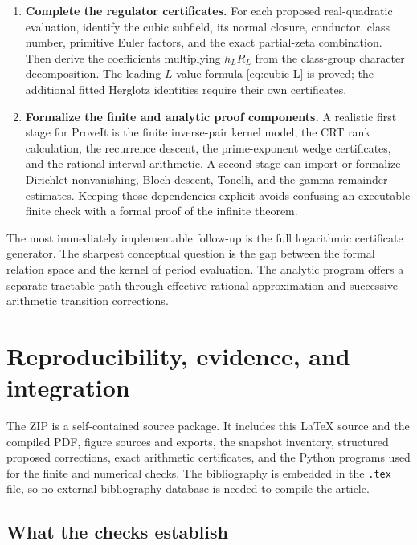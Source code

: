 \documentclass[11pt]{article}
\numberwithin{equation}{section}
\theoremstyle{definition}
\theoremstyle{remark}
\begin{document}
\begin{enumerate}[resume]
\item \textbf{Complete the regulator certificates.}
      For each proposed real-quadratic evaluation, identify the
      cubic subfield, its normal closure, conductor, class number,
      primitive Euler factors, and the exact partial-zeta
      combination. Then derive the coefficients multiplying
      $h_LR_L$ from the class-group character decomposition.
      The leading-$L$-value formula \eqref{eq:cubic-L} is proved;
      the additional fitted Herglotz identities require their
      own certificates.

\item \textbf{Formalize the finite and analytic proof components.}
      A realistic first stage for ProveIt is the finite inverse-pair
      kernel model, the CRT rank calculation, the recurrence
      descent, the prime-exponent wedge certificates, and the
      rational interval arithmetic. A second stage can import
      or formalize Dirichlet nonvanishing, Bloch descent,
      Tonelli, and the gamma remainder estimates. Keeping those
      dependencies explicit avoids confusing an executable
      finite check with a formal proof of the infinite theorem.
\end{enumerate}

The most immediately implementable follow-up is the full logarithmic
certificate generator. The sharpest conceptual question is the gap
between the formal relation space and the kernel of period evaluation.
The analytic program offers a separate tractable path through
effective rational approximation and successive arithmetic
transition corrections.

\section{Reproducibility, evidence, and integration}
\label{sec:reproducibility}

The ZIP is a self-contained source package. It includes this
\LaTeX{} source and the compiled PDF, figure sources and exports,
the snapshot inventory, structured proposed corrections, exact
arithmetic certificates, and the Python programs used for the
finite and numerical checks. The bibliography is embedded in the
\texttt{.tex} file, so no external bibliography database is needed
to compile the article.

\subsection{What the checks establish}
\end{document}
